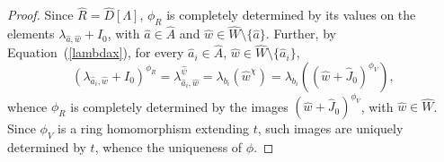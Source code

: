 \documentclass[10pt,a4paper]{amsart}
\newcommand{\A}{ {\hat A}}
\newcommand{\aR}{{\hat R}}
\newcommand{\hJ}{{\hat J}}
\newcommand{\hW}{{\hat W}}
\newcommand{\ha}{{\hat a}}
\newcommand{\hw}{{\hat w}}
\begin{document}
\begin{proof}
Since $\aR=\hat D[\Lambda]$, $\phi_R$ is completely determined by its values on the elements $\lambda_{\ha,\hw}+I_0$, with $\ha\in \A$ and $\hw\in \hW\setminus \{\ha\}$. Further, by Equation~(\ref{lambdax}), for every $\ha_i\in \A$, $\hw\in \hW\setminus \{\ha_i\}$, 
\begin{equation}\label{bendef}
(\lambda_{\ha_i,\hw}+I_0)^{\phi_R}=\lambda_{\ha_i,\hw}^{\hat\psi}=\lambda_{b_i}(\hw^\chi)=\lambda_{b_i}((\hw+\hJ_0)^{\phi_{V}}),
\end{equation}
whence  $\phi_R$ is completely determined by the images $(\hw+\hJ_0)^{\phi_{V}}$, with $\hw \in \hW$.  Since $\phi_{V}$ is a ring homomorphism extending $t$, such images are uniquely determined by $t$, whence the uniqueness of  $\phi$. 
\end{proof}
\end{document}
